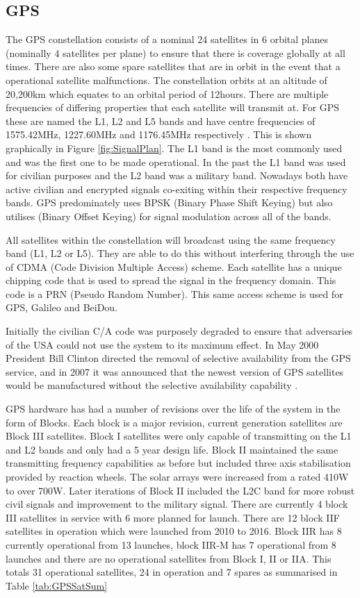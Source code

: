 \subsection{GPS} \label{subsec:GNSS_GPSIntro}
The GPS constellation consists of a nominal 24 satellites in 6 orbital planes (nominally 4 satellites per plane) to ensure that there is coverage globally at all times.
There are also some spare satellites that are in orbit in the event that a operational satellite malfunctions. The constellation orbits at an altitude of 20,200km which
equates to an orbital period of 12hours. There are multiple frequencies of differing properties that each satellite will transmit at. For GPS these are named the L1, L2
and L5 bands and have centre frequencies of 1575.42MHz, 1227.60MHz and 1176.45MHz respectively \cite{RN49}. This is shown graphically in Figure \ref{fig:SignalPlan}. The
L1 band is the most commonly used and was the first one to be made operational. In the past the L1 band was used for civilian purposes and the L2 band was a military
band. Nowadays both have active civilian and encrypted signals co-exiting within their respective frequency bands. GPS predominately uses BPSK (Binary Phase Shift Keying)
but also utilises  (Binary Offset Keying) for signal modulation across all of the bands. 

All satellites within the constellation will broadcast using the same frequency band (L1, L2 or L5). They are able to do this without interfering through the use of CDMA
(Code Division Multiple Access) scheme. Each satellite has a unique chipping code that is used to spread the signal in the frequency domain. This code is a PRN (Pseudo
Random Number). This same access scheme is used for GPS, Galileo and BeiDou.

Initially the civilian C/A code was purposely degraded to ensure that adversaries of the USA could not use the system to its maximum effect. In May 2000 President Bill
Clinton directed the removal of selective availability from the GPS service, and in 2007 it was announced that the newest version of GPS satellites would be manufactured
without the selective availability capability \cite{RN62} \cite{RN64}.

GPS hardware has had a number of revisions over the life of the system in the form of Blocks. Each block is a major revision, current generation satellites are Block III
satellites. Block I satellites were only capable of transmitting on the L1 and L2 bands and only had a 5 year design life. Block II maintained the same transmitting
frequency capabilities as before but included three axis stabilisation provided by reaction wheels. The solar arrays were increased from a rated 410W to over 700W. Later
iterations of Block II included the L2C band for more robust civil signals and improvement to the military signal.
There are currently 4 block III satellites in service with 6 more planned for launch. There are 12 block IIF satellites in operation which were launched from
2010 to 2016. Block IIR has 8 currently operational from 13 launches, block IIR-M has 7 operational from 8 launches and there are no operational satellites from Block I,
II or IIA. This totals 31 operational satellites, 24 in operation and 7 spares as summarised in Table \ref{tab:GPSSatSum}

